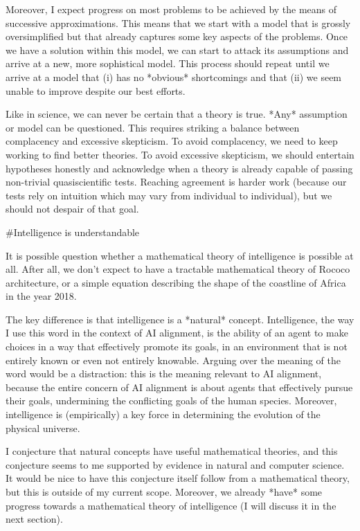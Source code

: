 \documentclass[a4paper]{article}
\begin{document}
Moreover, I expect progress on most problems to be achieved by the means of successive approximations. This means that we start with a model that is grossly oversimplified but that already captures some key aspects of the problems. Once we have a solution within this model, we can start to attack its assumptions and arrive at a new, more sophistical model. This process should repeat until we arrive at a model that (i) has no *obvious* shortcomings and that (ii) we seem unable to improve despite our best efforts. 

Like in science, we can never be certain that a theory is true. *Any* assumption or model can be questioned. This requires striking a balance between complacency and excessive skepticism. To avoid complacency, we need to keep working to find better theories. To avoid excessive skepticism, we should entertain hypotheses honestly and acknowledge when a theory is already capable of passing non-trivial quasiscientific tests. Reaching agreement is harder work (because our tests rely on intuition which may vary from individual to individual), but we should not despair of that goal.

\#Intelligence is understandable

It is possible question whether a mathematical theory of intelligence is possible at all. After all, we don't expect to have a tractable mathematical theory of Rococo architecture, or a simple equation describing the shape of the coastline of Africa in the year 2018.

The key difference is that intelligence is a *natural* concept. Intelligence, the way I use this word in the context of AI alignment, is the ability of an agent to make choices in a way that effectively promote its goals, in an environment that is not entirely known or even not entirely knowable. Arguing over the meaning of the word would be a distraction: this is the meaning relevant to AI alignment, because the entire concern of AI alignment is about agents that effectively pursue their goals, undermining the conflicting goals of the human species. Moreover, intelligence is (empirically) a key force in determining the evolution of the physical universe.

I conjecture that natural concepts have useful mathematical theories, and this conjecture seems to me supported by evidence in natural and computer science. It would be nice to have this conjecture itself follow from a mathematical theory, but this is outside of my current scope. Moreover, we already *have* some progress towards a mathematical theory of intelligence (I will discuss it in the next section).
\end{document}
